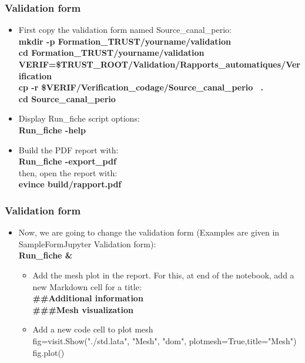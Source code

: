 \documentclass[10pt, hyperref={unicode=true,pdfusetitle, bookmarks=true,bookmarksnumbered=false,bookmarksopen=false, breaklinks=false,pdfborder={0 0l 1},backref=true,colorlinks=true,linkcolor=darkblue,pageanchor}]{beamer}
\begin{document}
\begin{frame}
\frametitle{Validation form}
\begin{block}{}

\begin{itemize}
\item First copy the validation form named Source\_canal\_perio:\\
{\small{
\textbf{mkdir -p Formation\_TRUST/yourname/validation} \\
\textbf{cd  Formation\_TRUST/yourname/validation} \\
\textbf{VERIF=\$TRUST\_ROOT/Validation/Rapports\_automatiques/Verification} \\
\textbf{cp -r \$VERIF/Verification\_codage/Source\_canal\_perio \, .} \\
\textbf{cd Source\_canal\_perio}
 }}\\

\item Display Run\_fiche script options:\\
\textbf{Run\_fiche -help}

\item Build the PDF report with:\\
\textbf{Run\_fiche -export\_pdf}\\
then, open the report with:\\
\textbf{evince build/rapport.pdf}
\end{itemize}

\end{block}
\end{frame}
\begin{frame}
\frametitle{Validation form}
\begin{block}{}

\begin{itemize}
\item Now, we are going to change the validation form (Examples are given in SampleFormJupyter Validation form):\\
\textbf{Run\_fiche \&}
    \begin{itemize}
    \item [$\circ$] Add the mesh plot in the report. For this, at end of the notebook, add a new Markdown cell for a title:\\
    \textbf{\#\#Additional information\\
    \#\#\#Mesh visualization } \\
    \item Add a new code cell to plot mesh \\
    \small{fig=visit.Show("./std.lata", "Mesh", "dom", plotmesh=True,title="Mesh")}\\
    \small{fig.plot()}
    \end{itemize}
\end{itemize}

\end{block}
\end{frame}
\end{document}
